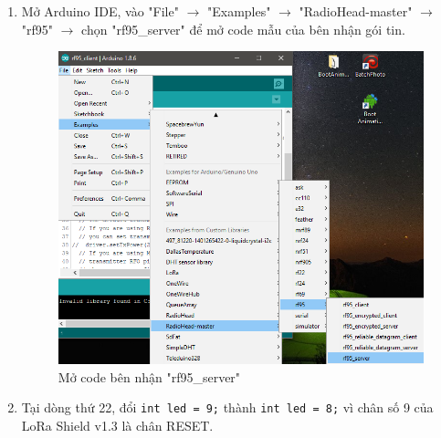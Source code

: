 \begin{enumerate}
\item Mở Arduino IDE, vào "File" $\rightarrow$ "Examples" $\rightarrow$ "RadioHead-master" $\rightarrow$ "rf95" $\rightarrow$ chọn "rf95\_server" để mở code mẫu của bên nhận gói tin.
\begin{center}
\begin{figure}[htp]
\begin{center}
\includegraphics[scale=0.7]{image4/arduino15.png}
\end{center}
\caption{Mở code bên nhận "rf95\_server"}
\end{figure}
\end{center}
\newpage
\item Tại dòng thứ 22, đổi \lstinline{int led = 9;} thành \lstinline{int led = 8;} vì chân số 9 của LoRa Shield v1.3 là chân RESET.
\begin{center}
\begin{figure}[htp]
\begin{center}

\end{center}
\end{figure}
\end{center}
\end{enumerate}
